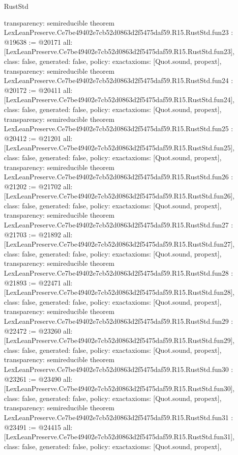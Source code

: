 \begin{lexlean}{RustStd}
\begin{coremodule}
{  transparency: semireducible
}
theorem LexLeanPreserve.Ce7be49402e7cb52d0863d2f5475daf59.R15.RustStd.fun23 : @19638 := @20171 {
  all: [LexLeanPreserve.Ce7be49402e7cb52d0863d2f5475daf59.R15.RustStd.fun23],
  class: false,
  generated: false,
  policy: exact{axioms: [Quot.sound, propext]},
  transparency: semireducible
}
theorem LexLeanPreserve.Ce7be49402e7cb52d0863d2f5475daf59.R15.RustStd.fun24 : @20172 := @20411 {
  all: [LexLeanPreserve.Ce7be49402e7cb52d0863d2f5475daf59.R15.RustStd.fun24],
  class: false,
  generated: false,
  policy: exact{axioms: [Quot.sound, propext]},
  transparency: semireducible
}
theorem LexLeanPreserve.Ce7be49402e7cb52d0863d2f5475daf59.R15.RustStd.fun25 : @20412 := @21201 {
  all: [LexLeanPreserve.Ce7be49402e7cb52d0863d2f5475daf59.R15.RustStd.fun25],
  class: false,
  generated: false,
  policy: exact{axioms: [Quot.sound, propext]},
  transparency: semireducible
}
theorem LexLeanPreserve.Ce7be49402e7cb52d0863d2f5475daf59.R15.RustStd.fun26 : @21202 := @21702 {
  all: [LexLeanPreserve.Ce7be49402e7cb52d0863d2f5475daf59.R15.RustStd.fun26],
  class: false,
  generated: false,
  policy: exact{axioms: [Quot.sound, propext]},
  transparency: semireducible
}
theorem LexLeanPreserve.Ce7be49402e7cb52d0863d2f5475daf59.R15.RustStd.fun27 : @21703 := @21892 {
  all: [LexLeanPreserve.Ce7be49402e7cb52d0863d2f5475daf59.R15.RustStd.fun27],
  class: false,
  generated: false,
  policy: exact{axioms: [Quot.sound, propext]},
  transparency: semireducible
}
theorem LexLeanPreserve.Ce7be49402e7cb52d0863d2f5475daf59.R15.RustStd.fun28 : @21893 := @22471 {
  all: [LexLeanPreserve.Ce7be49402e7cb52d0863d2f5475daf59.R15.RustStd.fun28],
  class: false,
  generated: false,
  policy: exact{axioms: [Quot.sound, propext]},
  transparency: semireducible
}
theorem LexLeanPreserve.Ce7be49402e7cb52d0863d2f5475daf59.R15.RustStd.fun29 : @22472 := @23260 {
  all: [LexLeanPreserve.Ce7be49402e7cb52d0863d2f5475daf59.R15.RustStd.fun29],
  class: false,
  generated: false,
  policy: exact{axioms: [Quot.sound, propext]},
  transparency: semireducible
}
theorem LexLeanPreserve.Ce7be49402e7cb52d0863d2f5475daf59.R15.RustStd.fun30 : @23261 := @23490 {
  all: [LexLeanPreserve.Ce7be49402e7cb52d0863d2f5475daf59.R15.RustStd.fun30],
  class: false,
  generated: false,
  policy: exact{axioms: [Quot.sound, propext]},
  transparency: semireducible
}
theorem LexLeanPreserve.Ce7be49402e7cb52d0863d2f5475daf59.R15.RustStd.fun31 : @23491 := @24415 {
  all: [LexLeanPreserve.Ce7be49402e7cb52d0863d2f5475daf59.R15.RustStd.fun31],
  class: false,
  generated: false,
  policy: exact{axioms: [Quot.sound, propext]},
}
\end{coremodule}
\end{lexlean}
